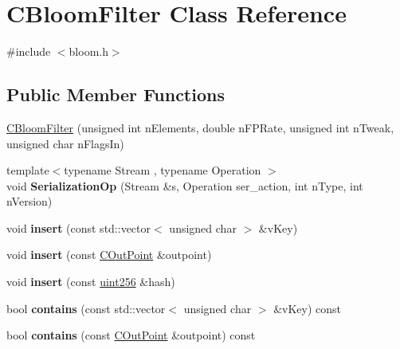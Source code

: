 \hypertarget{class_c_bloom_filter}{}\section{C\+Bloom\+Filter Class Reference}
\label{class_c_bloom_filter}


{\ttfamily \#include $<$bloom.\+h$>$}

\subsection*{Public Member Functions}
\begin{DoxyCompactItemize}
\item 
\mbox{\hyperlink{class_c_bloom_filter_a6395cfcb278ed9cf4ae873549c996f83}{C\+Bloom\+Filter}} (unsigned int n\+Elements, double n\+F\+P\+Rate, unsigned int n\+Tweak, unsigned char n\+Flags\+In)
\item 
\mbox{\label{class_c_bloom_filter_a2d12234d7febc6197a7349d609733cca}} 
{\footnotesize template$<$typename Stream , typename Operation $>$ }\\void {\bfseries Serialization\+Op} (Stream \&s, Operation ser\+\_\+action, int n\+Type, int n\+Version)
\item 
\mbox{\label{class_c_bloom_filter_abba52843c7c691ef7deb07d9a645dcc2}} 
void {\bfseries insert} (const std\+::vector$<$ unsigned char $>$ \&v\+Key)
\item 
\mbox{\label{class_c_bloom_filter_aa77e023fc94fd17a0532bf17906e2146}} 
void {\bfseries insert} (const \mbox{\hyperlink{class_c_out_point}{C\+Out\+Point}} \&outpoint)
\item 
\mbox{\label{class_c_bloom_filter_ac86479ac4ac157a7f0188baaa93202cb}} 
void {\bfseries insert} (const \mbox{\hyperlink{classuint256}{uint256}} \&hash)
\item 
\mbox{\label{class_c_bloom_filter_afe62e10a4c4cf64e18a2a659d0bcc31b}} 
bool {\bfseries contains} (const std\+::vector$<$ unsigned char $>$ \&v\+Key) const
\item 
\mbox{\label{class_c_bloom_filter_af4557c3253f218eaf13e6d7da53e20e9}} 
bool {\bfseries contains} (const \mbox{\hyperlink{class_c_out_point}{C\+Out\+Point}} \&outpoint) const

\end{DoxyCompactItemize}
